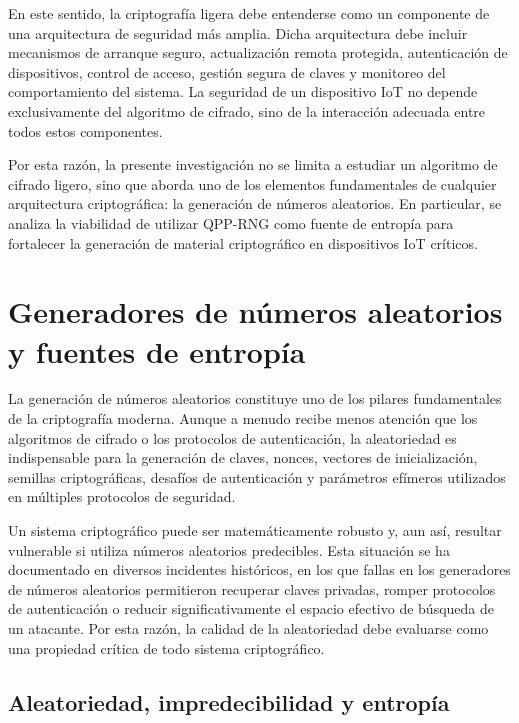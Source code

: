 En este sentido, la criptografía ligera debe entenderse como un componente de una arquitectura de seguridad más amplia. Dicha arquitectura debe incluir mecanismos de arranque seguro, actualización remota protegida, autenticación de dispositivos, control de acceso, gestión segura de claves y monitoreo del comportamiento del sistema. La seguridad de un dispositivo IoT no depende exclusivamente del algoritmo de cifrado, sino de la interacción adecuada entre todos estos componentes.

Por esta razón, la presente investigación no se limita a estudiar un algoritmo de cifrado ligero, sino que aborda uno de los elementos fundamentales de cualquier arquitectura criptográfica: la generación de números aleatorios. En particular, se analiza la viabilidad de utilizar QPP-RNG como fuente de entropía para fortalecer la generación de material criptográfico en dispositivos IoT críticos.


\section{Generadores de números aleatorios y fuentes de entropía}

La generación de números aleatorios constituye uno de los pilares fundamentales de la criptografía moderna. Aunque a menudo recibe menos atención que los algoritmos de cifrado o los protocolos de autenticación, la aleatoriedad es indispensable para la generación de claves, nonces, vectores de inicialización, semillas criptográficas, desafíos de autenticación y parámetros efímeros utilizados en múltiples protocolos de seguridad.

Un sistema criptográfico puede ser matemáticamente robusto y, aun así, resultar vulnerable si utiliza números aleatorios predecibles. Esta situación se ha documentado en diversos incidentes históricos, en los que fallas en los generadores de números aleatorios permitieron recuperar claves privadas, romper protocolos de autenticación o reducir significativamente el espacio efectivo de búsqueda de un atacante. Por esta razón, la calidad de la aleatoriedad debe evaluarse como una propiedad crítica de todo sistema criptográfico.

\subsection{Aleatoriedad, impredecibilidad y entropía}

